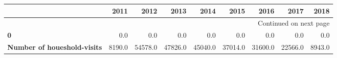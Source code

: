 \begin{longtable}{lrrrrrrrr}
\toprule
{} &    2011 &     2012 &     2013 &     2014 &     2015 &     2016 &     2017 &    2018 \\
\midrule
\endhead
\midrule
\multicolumn{9}{r}{{Continued on next page}} \\
\midrule
\endfoot

\bottomrule
\endlastfoot
\textbf{0                         } &     0.0 &      0.0 &      0.0 &      0.0 &      0.0 &      0.0 &      0.0 &     0.0 \\
\textbf{Number of houeshold-visits} &  8190.0 &  54578.0 &  47826.0 &  45040.0 &  37014.0 &  31600.0 &  22566.0 &  8943.0 \\
\end{longtable}
